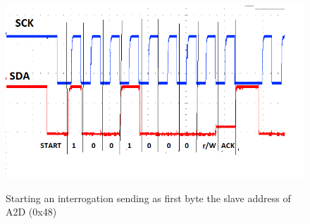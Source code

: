 \begin{figure}[H]
\centering
\includegraphics[scale=.7]{Immagini/09}
\label{09}
\caption{Starting an interrogation sending as first byte the slave address of A2D (0x48)}
\end{figure}
